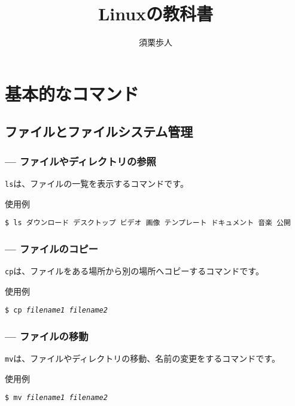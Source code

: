 \documentclass[a4j]{jreport}
\begin{document}
\title{Linuxの教科書}
\author{須栗歩人}
\maketitle

\tableofcontents

\part{基本的なコマンド}

\chapter{ファイルとファイルシステム管理}

\section{\texttt{} --- ファイルやディレクトリの参照}

\texttt{ls}は、ファイルの一覧を表示するコマンドです。

\begin{itembox}[l]{使用例}
	\begin{alltt}\texttt{\$ ls
		ダウンロード  デスクトップ  ビデオ  画像
		テンプレート  ドキュメント  音楽    公開}\end{alltt}
\end{itembox}

\section{\texttt{} --- ファイルのコピー}

\texttt{cp}は、ファイルをある場所から別の場所へコピーするコマンドです。

\begin{itembox}[l]{使用例}
	\begin{alltt}\texttt{\$ cp \textit{filename1 filename2}}\end{alltt}
\end{itembox}

\section{\texttt{} --- ファイルの移動}

\texttt{mv}は、ファイルやディレクトリの移動、名前の変更をするコマンドです。

\begin{itembox}[l]{使用例}
	\begin{alltt}\texttt{\$ mv \textit{filename1 filename2}}\end{alltt}
\end{itembox}
\end{document}
